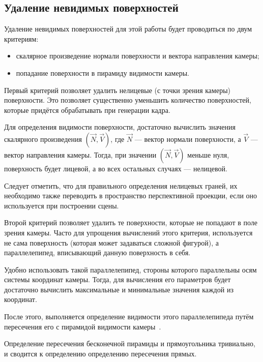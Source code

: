 \subsection{Удаление невидимых поверхностей}

Удаление невидимых поверхностей для этой работы будет проводиться по двум критериям:

\begin{itemize}
    \item скалярное произведение нормали поверхности и вектора направления камеры;
    \item попадание поверхности в пирамиду видимости камеры.
\end{itemize}

Первый критерий позволяет удалить нелицевые (с точки зрения камеры) поверхности. Это позволяет существенно уменьшить количество поверхностей, которые придётся обрабатывать при генерации кадра.

Для определения видимости поверхности, достаточно вычислить значения скалярного произведения $(\vec{N}, \vec{V})$, где $\vec{N}$ --- вектор нормали поверхности, а $\vec{V}$ --- вектор направления камеры. Тогда, при значении $(\vec{N}, \vec{V})$ меньше нуля, поверхность будет лицевой, а во всех остальных случаях --- нелицевой.

Следует отметить, что для правильного определения нелицевых граней, их необходимо также переводить в пространство перспективной проекции, если оно используется при построении сцены.

Второй критерий позволяет удалить те поверхности, которые не попадают в поле зрения камеры. Часто для упрощения вычислений этого критерия, используется не сама поверхность (которая может задаваться сложной фигурой), а параллелепипед, вписывающий данную поверхность в себя.

Удобно использовать такой параллелепипед, стороны которого параллельны осям системы координат камеры. Тогда, для вычисления его параметров будет достаточно вычислить максимальные и минимальные значения каждой из координат.

После этого, выполняется определение видимости этого параллелепипеда путём пересечения его с пирамидой видимости камеры~\cite{Rogers}.

Определение пересечения бесконечной пирамиды и прямоугольника тривиально, и сводится к определению определению пересечения прямых.